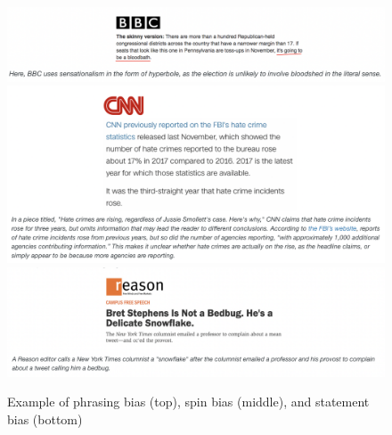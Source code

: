 \begin{figure}[htbp]
    \centering
    \includegraphics[width=0.95\linewidth]{images/phrasing_bias_example.png}
    \includegraphics[width=0.95\linewidth]{images/spin_bias_example.png}
    \includegraphics[width=0.95\linewidth]{images/statement_bias_example.png}
    \caption{Example of phrasing bias (top), spin bias (middle), and statement bias (bottom) \cite{allsides-media-bias-types}}
    \label{fig:bias-examples}
\end{figure}

